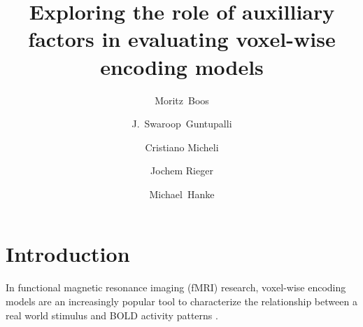 
\newcommand{\beginsupplement}{%
        \setcounter{table}{0}
        \renewcommand{\thetable}{S\arabic{table}}%
        \setcounter{figure}{0}
        \renewcommand{\thefigure}{S\arabic{figure}}%
     }




\title{Exploring the role of auxilliary factors in evaluating voxel-wise encoding models}


\author[1]{Moritz~Boos}
\author[2]{J.~Swaroop~Guntupalli}
\author[1]{Cristiano Micheli}
\author[1]{Jochem Rieger}
\author[3,4]{Michael~Hanke}

\maketitle

\listoftodos

\begin{abstract}

\end{abstract}

\clearpage


\section*{Introduction}

In functional magnetic resonance imaging (f{MRI}) research, voxel-wise encoding
models are an increasingly popular tool to characterize the relationship
between a real world stimulus and BOLD activity patterns
\citep{NG11,TD+06,KG+08,SZ09}.


